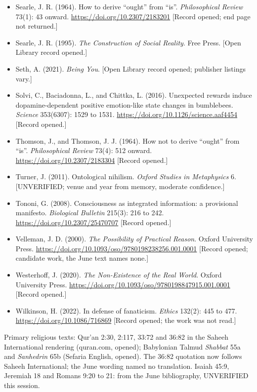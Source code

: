 \documentclass[11pt]{article}
\begin{document}
\begin{itemize}
\item Searle, J. R. (1964). How to derive ``ought'' from ``is''. \emph{Philosophical Review} 73(1): 43 onward. \url{https://doi.org/10.2307/2183201} [Record opened; end page not returned.]
\item Searle, J. R. (1995). \emph{The Construction of Social Reality}. Free Press. [Open Library record opened.]
\item Seth, A. (2021). \emph{Being You}. [Open Library record opened; publisher listings vary.]
\item Solvi, C., Baciadonna, L., and Chittka, L. (2016). Unexpected rewards induce dopamine-dependent positive emotion-like state changes in bumblebees. \emph{Science} 353(6307): 1529 to 1531. \url{https://doi.org/10.1126/science.aaf4454} [Record opened.]
\item Thomson, J., and Thomson, J. J. (1964). How not to derive ``ought'' from ``is''. \emph{Philosophical Review} 73(4): 512 onward. \url{https://doi.org/10.2307/2183304} [Record opened.]
\item Turner, J. (2011). Ontological nihilism. \emph{Oxford Studies in Metaphysics} 6. [UNVERIFIED; venue and year from memory, moderate confidence.]
\item Tononi, G. (2008). Consciousness as integrated information: a provisional manifesto. \emph{Biological Bulletin} 215(3): 216 to 242. \url{https://doi.org/10.2307/25470707} [Record opened.]
\item Velleman, J. D. (2000). \emph{The Possibility of Practical Reason}. Oxford University Press. \url{https://doi.org/10.1093/oso/9780198238256.001.0001} [Record opened; candidate work, the June text names none.]
\item Westerhoff, J. (2020). \emph{The Non-Existence of the Real World}. Oxford University Press. \url{https://doi.org/10.1093/oso/9780198847915.001.0001} [Record opened.]
\item Wilkinson, H. (2022). In defense of fanaticism. \emph{Ethics} 132(2): 445 to 477. \url{https://doi.org/10.1086/716869} [Record opened; the work was not read.]
\end{itemize}
Primary religious texts: Qur'an 2:30, 2:117, 33:72 and 36:82 in the Saheeh International rendering (quran.com, opened); Babylonian Talmud \emph{Shabbat} 55a and \emph{Sanhedrin} 65b (Sefaria English, opened). The 36:82 quotation now follows Saheeh International; the June wording named no translation. Isaiah 45:9, Jeremiah 18 and Romans 9:20 to 21: from the June bibliography, UNVERIFIED this session.
\end{document}
